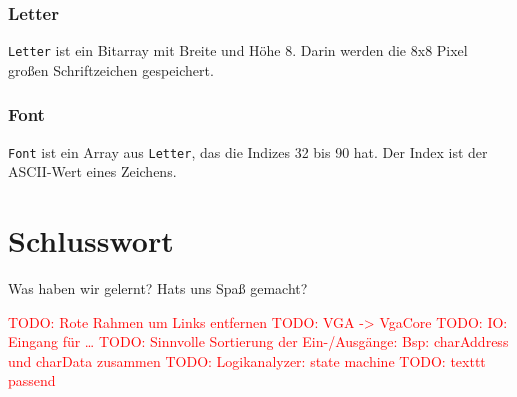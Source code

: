 \documentclass[IN,ngerman,utf8,12pt]{tumbook}
\newcommand\todo[1]{\textcolor{red}{TODO: #1}}
\begin{document}
\subsection{Letter}
\label{kap:letter}
\texttt{Letter} ist ein Bitarray mit Breite und Höhe 8.
Darin werden die 8x8 Pixel großen Schriftzeichen gespeichert.

\subsection{Font}
\label{kap:font}
\texttt{Font} ist ein Array aus \texttt{Letter}, das die Indizes 32 bis 90 hat.
Der Index ist der ASCII-Wert eines Zeichens.

\chapter{Schlusswort}
Was haben wir gelernt? Hats uns Spaß gemacht?

\todo{Rote Rahmen um Links entfernen}
\todo{VGA -> VgaCore}
\todo{IO: Eingang für \ldots}
\todo{Sinnvolle Sortierung der Ein-/Ausgänge: Bsp: charAddress und charData zusammen}
\todo{Logikanalyzer: state machine}
\todo{texttt passend}


\clearpage
\appendix%
\listoffigures%
\end{document}
